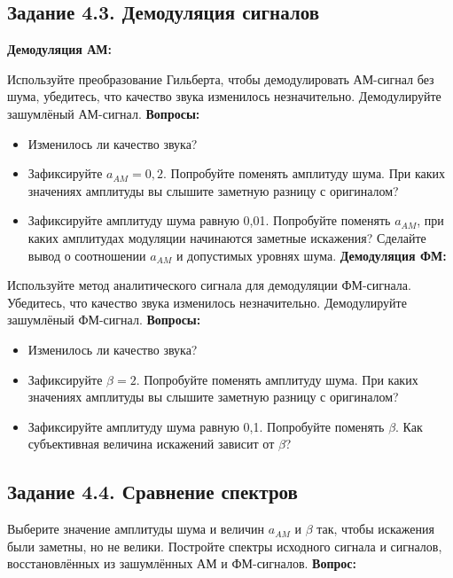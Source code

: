 \documentclass[12pt,a4paper,openany]{book}
\providecommand{\tightlist}{\setlength{\itemsep}{0pt}\setlength{\parskip}{0pt}}
\begin{document}
\subsection*{Задание 4.3. Демодуляция сигналов}

\textbf{Демодуляция АМ:}

Используйте преобразование Гильберта, чтобы демодулировать АМ-сигнал без шума, убедитесь, что качество звука изменилось незначительно.
Демодулируйте зашумлёный АМ-сигнал.
\textbf{Вопросы:}

\begin{itemize}
\tightlist
\item
  Изменилось ли качество звука?
\item
  Зафиксируйте \(a_{AM}=0{,}2\). Попробуйте поменять амплитуду шума. При каких значениях амплитуды вы слышите заметную разницу с оригиналом?
\item
  Зафиксируйте амплитуду шума равную 0,01. Попробуйте поменять \(a_{AM}\), при каких амплитудах модуляции начинаются заметные искажения? Сделайте вывод о соотношении \(a_{AM}\) и допустимых уровнях шума.
  \textbf{Демодуляция ФМ:}
\end{itemize}

Используйте метод аналитического сигнала для демодуляции ФМ-сигнала. Убедитесь, что качество звука изменилось незначительно.
Демодулируйте зашумлёный ФМ-сигнал.
\textbf{Вопросы:}

\begin{itemize}
\tightlist
\item
  Изменилось ли качество звука?
\item
  Зафиксируйте \(\beta=2\). Попробуйте поменять амплитуду шума. При каких значениях амплитуды вы слышите заметную разницу с оригиналом?
\item
  Зафиксируйте амплитуду шума равную 0,1. Попробуйте поменять \(\beta\). Как субъективная величина искажений зависит от \(\beta\)?
\end{itemize}

\subsection*{Задание 4.4. Сравнение спектров}

Выберите значение амплитуды шума и величин \(a_{AM}\) и \(\beta\) так, чтобы искажения были заметны, но не велики. Постройте спектры исходного сигнала и сигналов, восстановлённых из зашумлённых АМ и ФМ-сигналов.
\textbf{Вопрос:}
\end{document}
